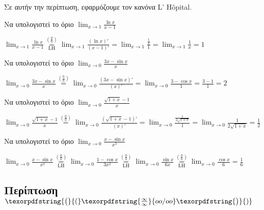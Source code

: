 Σε αυτήν την περίπτωση, εφαρμόζουμε τον κανόνα L' H\^{o}pital.

\begin{example}
  Να υπολογιστεί το όριο $ \lim_{x \to 1} \frac{\ln{x}}{x-1} $
\end{example}
\begin{solution}
  $ \lim_{x \to 1} \frac{\ln{x}}{x-1}
  \overset{\left(\frac{0}{0}\right)}{\underset{\mathrm{LH}}{=}}  \lim_{x \to 1} 
  \frac{(\ln{x} )'}{(x-1)'} = \lim_{x \to 1} \frac{\frac{1}{x}}{1} = 
  \lim_{x \to 1} \frac{1}{x} = 1 $
\end{solution}

\begin{example}
  Να υπολογιστεί το όριο $ \lim_{x \to 0} \frac{3x- \sin{x}}{x} $
\end{example}
\begin{solution}
  $ \lim_{x \to 0} \frac{3x- \sin{x}}{x} \overset{(\frac{0}{0})}{=} \lim_{x \to 0}
  \frac{(3x- \sin{x} )'}{(x)'} = \lim_{x \to 0} \frac{3- \cos{x}}{1} = \frac{3- 1}{1}
  = 2 $
\end{solution}

\begin{example}
  Να υπολογιστεί το όριο $ \lim_{x \to 0} \frac{\sqrt{1+x} -1}{x} $
\end{example}
\begin{solution}
  $ \lim_{x \to 0} \frac{\sqrt{1+x} -1}{x} \overset{(\frac{0}{0})}{=} \lim_{x \to 0}
  \frac{(\sqrt{1+x} -1)'}{(x)'} = \lim_{x \to 0} \frac{\frac{1}{2 \sqrt{1+x}}}{1} = 
  \lim_{x \to 0} \frac{1}{2 \sqrt{1+x}} = \frac{1}{2} $
\end{solution}

\begin{example}
  Να υπολογιστεί το όριο $ \lim_{x \to 0} \frac{x- \sin{x}}{x^{3}} $
\end{example}
\begin{solution} 
  $\lim_{x \to 0} \frac{x - \sin{x}}{x^{3}}
  \overset{\left(\frac{0}{0}\right)}{\underset{\mathrm{LH}}{=}} 
  \lim_{x \to 0} \frac{1 - \cos{x}}{3x^{2}}
  \overset{\left(\frac{0}{0}\right)}{\underset{\mathrm{LH}}{=}} 
  \lim_{x \to 0} \frac{\sin{x}}{6x} 
  \overset{\left(\frac{0}{0}\right)}{\underset{\mathrm{LH}}{=}} 
  \lim_{x \to 0} \frac{\cos{x}}{6} = \frac{1}{6}$ 
\end{solution}


\subsection{Περίπτωση $
\texorpdfstring{\bigl(}{(}\texorpdfstring{\frac{\infty}{\infty}}{oo/oo}\texorpdfstring{\bigr)}{)} $}

